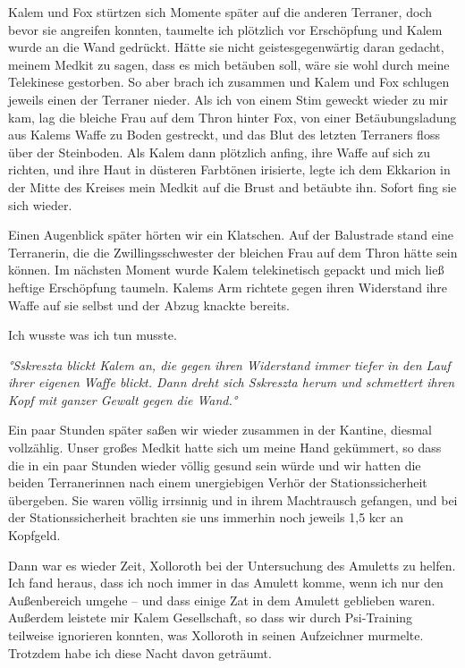 \documentclass[11pt]{article}
\begin{document}
Kalem und Fox stürtzen sich Momente später auf die anderen Terraner,
doch bevor sie angreifen konnten, taumelte ich plötzlich vor Erschöpfung
und Kalem wurde an die Wand gedrückt. Hätte sie nicht geistesgegenwärtig
daran gedacht, meinem Medkit zu sagen, dass es mich betäuben soll, wäre
sie wohl durch meine Telekinese gestorben. So aber brach ich zusammen
und Kalem und Fox schlugen jeweils einen der Terraner nieder. Als ich
von einem Stim geweckt wieder zu mir kam, lag die bleiche Frau auf dem
Thron hinter Fox, von einer Betäubungsladung aus Kalems Waffe zu Boden
gestreckt, und das Blut des letzten Terraners floss über der Steinboden.
Als Kalem dann plötzlich anfing, ihre Waffe auf sich zu richten, und
ihre Haut in düsteren Farbtönen irisierte, legte ich dem Ekkarion in der
Mitte des Kreises mein Medkit auf die Brust and betäubte ihn. Sofort
fing sie sich wieder.

Einen Augenblick später hörten wir ein Klatschen. Auf der Balustrade
stand eine Terranerin, die die Zwillingsschwester der bleichen Frau auf
dem Thron hätte sein können. Im nächsten Moment wurde Kalem
telekinetisch gepackt und mich ließ heftige Erschöpfung taumeln. Kalems
Arm richtete gegen ihren Widerstand ihre Waffe auf sie selbst und der
Abzug knackte bereits.

Ich wusste was ich tun musste.

\emph{°Sskreszta blickt Kalem an, die gegen ihren Widerstand immer
tiefer in den Lauf ihrer eigenen Waffe blickt. Dann dreht sich Sskreszta
herum und schmettert ihren Kopf mit ganzer Gewalt gegen die Wand.°}

Ein paar Stunden später saßen wir wieder zusammen in der Kantine,
diesmal vollzählig. Unser großes Medkit hatte sich um meine Hand
gekümmert, so dass die in ein paar Stunden wieder völlig gesund sein
würde und wir hatten die beiden Terranerinnen nach einem unergiebigen
Verhör der Stationssicherheit übergeben. Sie waren völlig irrsinnig und
in ihrem Machtrausch gefangen, und bei der Stationssicherheit brachten
sie uns immerhin noch jeweils 1,5 kcr an Kopfgeld.

Dann war es wieder Zeit, Xolloroth bei der Untersuchung des Amuletts zu
helfen. Ich fand heraus, dass ich noch immer in das Amulett komme, wenn
ich nur den Außenbereich umgehe -- und dass einige Zat in dem Amulett
geblieben waren. Außerdem leistete mir Kalem Gesellschaft, so dass wir
durch Psi-Training teilweise ignorieren konnten, was Xolloroth in seinen
Aufzeichner murmelte. Trotzdem habe ich diese Nacht davon geträumt.
\end{document}
